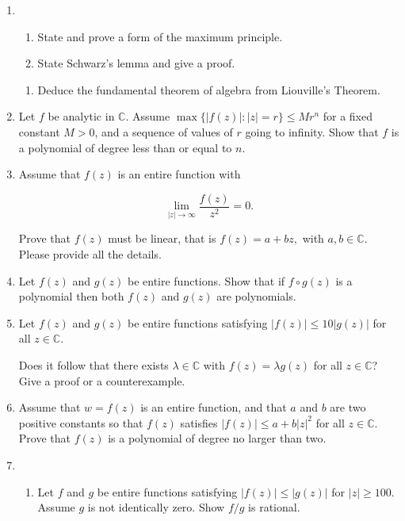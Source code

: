 \documentclass[a4paper,10pt]{article}
\begin{document}
\begin{enumerate}
		\item 
		
		\begin{enumerate}
		\item State and prove a form of the maximum principle.
		 \item State Schwarz's lemma and give a proof.
		\end{enumerate}
		

		\begin{enumerate}
			\item Deduce the fundamental theorem of algebra from Liouville's Theorem.
		\end{enumerate}

		
		\item Let $f$ be analytic in $\mathbb{C}$. Assume $\max\{|f(z)|:|z|=r\}\le Mr^{n}$ for a fixed constant $M>0$,
		and a sequence of values of $r$ going to infinity.
		Show that $f$ is a polynomial of degree less than or equal to $n$.
		
		\item Assume that $f(z)$ is an entire function with
		
		\[\lim_{|z|\rightarrow\infty}\frac{f(z)}{z^{2}}=0.\]
		
		Prove that $f(z)$ must be linear, that is $f(z)=a+bz,$ with $a, b\in \mathbb{C}$. Please provide all the details.
		
		\item Let $f(z)$ and $g(z)$ be entire functions. Show that if $f\circ g(z)$ is a polynomial then both $f(z)$ and $g(z)$ are polynomials.
		
		\item Let $f(z)$ and $g(z)$ be entire functions satisfying $|f(z)|\le 10|g(z)|$ for all $z\in\mathbb{C}$.
		
		Does it follow that there exists $\lambda\in\mathbb{C}$ with $f(z)=\lambda g(z)$ for all $z\in\mathbb{C}$?
		Give a proof or a counterexample.
		
		\item Assume that $w=f(z)$ is an entire function, and that $a$ and $b$ are two positive constants so that $f(z)$ satisfies $|f(z)|\le a+b|z|^{2}$ for all $z\in \mathbb{C}$. Prove that $f(z)$ is a polynomial of degree no larger than two.
		
		\item 
		
		\begin{enumerate}
			\item Let $f$ and $g$ be entire functions satisfying $|f(z)|\le|g(z)|$ for $|z|\ge100$. Assume $g$ is not identically zero.
		Show $f/g$ is rational.
		

\end{enumerate}
\end{enumerate}
\end{document}
